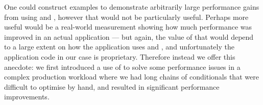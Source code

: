 One could construct examples to demonstrate arbitrarily large
performance gains from using  and , however that
would not be particularly useful. Perhaps more useful would be a
real-world measurement showing how much performance was improved in an
actual application --- but again, the value of that would depend to a
large extent on how the application uses  and , and
unfortunately the application code in our case is
proprietary. Therefore instead we offer this anecdote: we first
introduced a use of  to solve some performance issues in a
complex production workload where we had long chains of conditionals
that were difficult to optimise by hand, and  resulted in
significant performance improvements.
